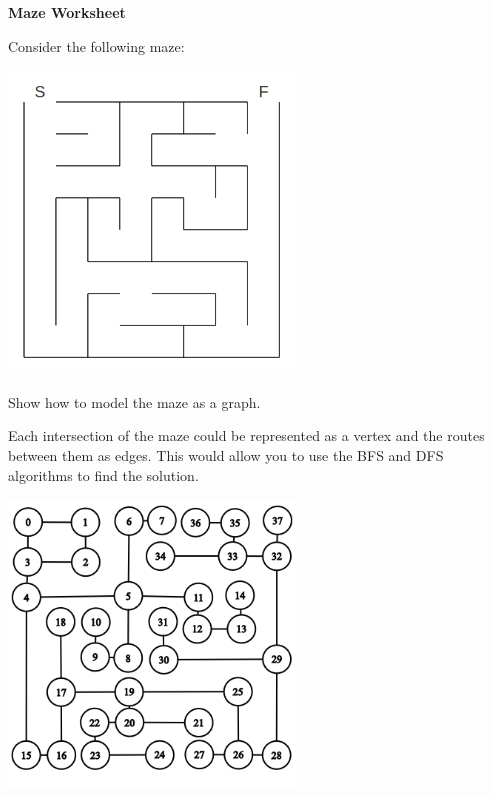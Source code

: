 \documentclass[12pt]{article}
\begin{document}
\newcommand{\lsp}[1]{\large\renewcommand{\baselinestretch}{#1}\normalsize}

\lsp{1}
\pagestyle{plain}
\begin{center}
{\bf
Maze Worksheet
}
\end{center}

\begin{flushleft}
   Consider the following maze:
\end{flushleft}

\begin{center}
   \includegraphics[width=3in]{./maze.jpg}
\end{center}
\begin{flushleft}
   Show how to model the maze as a graph.

   Each intersection of the maze could be represented as a vertex and the
   routes between them as edges. This would allow you to use the BFS and DFS
   algorithms to find the solution.
\end{flushleft}
\begin{center}
   \includegraphics[width=3in]{./graph.png}
\end{center}
\end{document}
